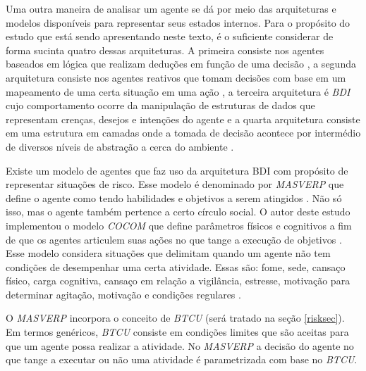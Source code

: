 Uma outra maneira de analisar um agente se dá por meio das arquiteturas e modelos disponíveis para representar seus estados internos. Para o propósito do estudo que está sendo apresentando neste texto, é o suficiente considerar de forma sucinta quatro dessas arquiteturas. A primeira consiste nos agentes baseados em lógica que realizam deduções em função de uma decisão \cite{logicagent}, a segunda arquitetura consiste nos agentes reativos que tomam decisões com base em um mapeamento de uma certa situação em uma  ação \cite{reactiveagent}, a terceira arquitetura é \textit{BDI} cujo comportamento ocorre da manipulação de estruturas de dados que representam crenças, desejos e intenções do agente \cite{bdi} e a quarta arquitetura consiste em uma estrutura em camadas onde a tomada de decisão acontece por intermédio de diversos níveis de abstração a cerca do ambiente \cite{layeragent} \cite{whatisagent}.  

Existe um modelo de agentes que faz uso da arquitetura BDI com propósito de representar situações de risco. Esse modelo é denominado por \textit{MASVERP} que define o agente como tendo habilidades e objetivos a serem atingidos \cite{mavesp}. Não só isso, mas o agente também pertence a certo círculo social. O autor deste estudo implementou o modelo \textit{COCOM} que define parâmetros físicos e cognitivos a fim de que os agentes articulem suas ações no que tange a execução de objetivos \cite{mavesp}. Esse modelo considera situações que delimitam quando um agente não tem condições de desempenhar uma certa atividade. Essas são: fome, sede, cansaço físico, carga cognitiva, cansaço em relação a vigilância, estresse, motivação para determinar agitação, motivação e condições regulares \cite{mavesp}. 

O \textit{MASVERP} incorpora o conceito de \textit{BTCU} (será tratado na seção \ref{risksec}). Em termos genéricos, \textit{BTCU} consiste em condições limites que são aceitas para que um agente possa realizar a atividade. No \textit{MASVERP} a decisão do agente no que tange a executar ou não uma atividade é parametrizada com base no \textit{BTCU}. 